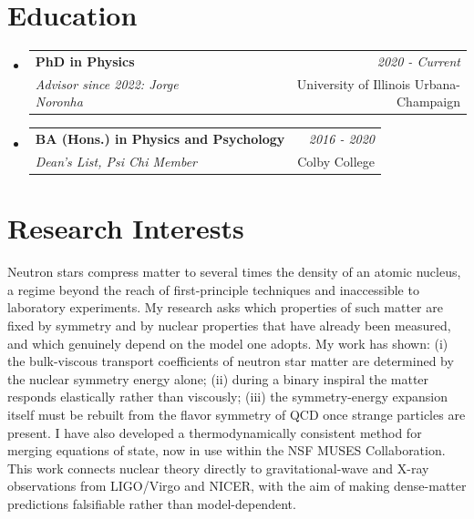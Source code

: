 \documentclass[a4paper,11pt]{article}
\makeatletter
\newcommand{\resumeSubheading}[4]{
\vspace{0.5mm}\item
    \begin{tabular*}{0.98\textwidth}[t]{l@{\extracolsep{\fill}}r}
        \textbf{#1} & \textit{\footnotesize{#4}} \\
        \textit{\footnotesize{#3}} &  \footnotesize{#2}\\
    \end{tabular*}
    \vspace{-2.4mm}
}
\newcommand{\resumeSubHeadingListStart}{\begin{itemize}[leftmargin=*,labelsep=1mm]}
\newcommand{\resumeSubHeadingListEnd}{\end{itemize}\vspace{2mm}}
\makeatother
\begin{document}
\section{\textbf{Education}}
\vspace{-0.4mm}
\resumeSubHeadingListStart

\resumeSubheading
{PhD in Physics}{University of Illinois Urbana-Champaign}
{Advisor since 2022: Jorge Noronha}{2020 - Current}

\resumeSubheading
{BA (Hons.) in Physics and Psychology}{Colby College}
{Dean's List, Psi Chi Member}{2016 - 2020}

\resumeSubHeadingListEnd
\vspace{-6mm}


























\section{\textbf{Research Interests}}
\vspace{-0.4mm}
Neutron stars compress matter to several times the density of an atomic nucleus, a regime beyond the reach of first-principle techniques and inaccessible to laboratory experiments. My research asks which properties of such matter are fixed by symmetry and by nuclear properties that have already been measured, and which genuinely depend on the model one adopts. 
My work has shown: (i) the bulk-viscous transport coefficients of neutron star matter are determined by the nuclear symmetry energy alone; (ii) during a binary inspiral the matter responds elastically rather than viscously; (iii) the symmetry-energy expansion itself must be rebuilt from the flavor symmetry of QCD once strange particles are present. I have also developed a thermodynamically consistent method for merging equations of state, now in use within the NSF MUSES Collaboration. This work connects nuclear theory directly to gravitational-wave and X-ray observations from LIGO/Virgo and NICER, with the aim of making dense-matter predictions falsifiable rather than model-dependent.  
\end{document}
